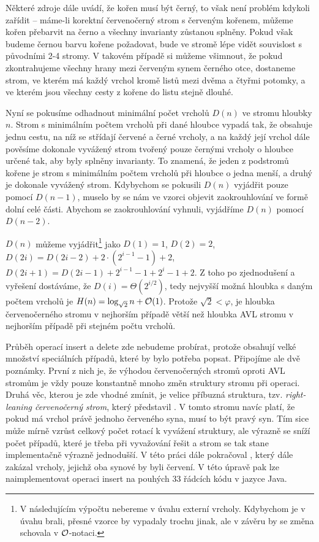 Některé zdroje dále uvádí, že kořen musí být černý, to však není problém kdykoli zařídit -- máme-li korektní červenočerný strom s červeným kořenem, můžeme kořen přebarvit na černo a všechny invarianty zůstanou splněny. Pokud však budeme černou barvu kořene požadovat, bude ve stromě lépe vidět souvislost s původními 2-4 stromy. V takovém případě si můžeme všimnout, že pokud zkontrahujeme všechny hrany mezi červeným synem černého otce, dostaneme strom, ve kterém má každý vrchol kromě listů mezi dvěma a čtyřmi potomky, a ve kterém jsou všechny cesty z kořene do listu stejně dlouhé.

Nyní se pokusíme odhadnout minimální počet vrcholů $D(n)$ ve stromu hloubky $n$. Strom s minimálním počtem vrcholů při dané hloubce vypadá tak, že obsahuje jednu cestu, na níž se střídají červené a černé vrcholy, a na každý její vrchol dále pověsíme dokonale vyvážený strom tvořený pouze černými vrcholy o hloubce určené tak, aby byly splněny invarianty. To znamená, že jeden z podstromů kořene je strom s minimálním počtem vrcholů při hloubce o jedna menší, a druhý je dokonale vyvážený strom. Kdybychom se pokusili $D(n)$ vyjádřit pouze pomocí $D(n-1)$, muselo by se nám ve vzorci objevit zaokrouhlování ve formě dolní celé části. Abychom se zaokrouhlování vyhnuli, vyjádříme $D(n)$ pomocí $D(n-2)$.

$D(n)$ můžeme vyjádřit\footnote{V následujícím výpočtu nebereme v úvahu externí vrcholy. Kdybychom je v úvahu brali, přesné vzorce by vypadaly trochu jinak, ale v závěru by se změna schovala v $\mathcal O$-notaci.} jako $D(1)=1$, $D(2) = 2$, $D(2i) = D(2i-2) + 2 \cdot
(2^{i - 1} - 1) + 2$, $D(2i + 1) = D(2i - 1) + 2^{i-1}-1 + 2^i-1 + 2$. Z toho
po zjednodušení a vyřešení dostáváme, že $D(i)=\Theta(2^{i/2})$, tedy nejvyšší
možná hloubka s daným počtem vrcholů je $H(n) = \log_{\sqrt 2} n + \mathcal O(1)$.
Protože  $\sqrt 2 < \varphi$, je hloubka červenočerného stromu v nejhorším
případě větší než hloubka AVL stromu v nejhorším případě při stejném počtu
vrcholů.

Průběh operací insert a delete zde nebudeme probírat, protože obsahují velké
množství speciálních případů, které by bylo potřeba popsat. Připojíme ale
dvě poznámky. První z nich je, že výhodou červenočerných stromů oproti AVL
stromům je vždy pouze konstantně mnoho změn struktury stromu při operaci. Druhá
věc, kterou je zde vhodné zmínit, je velice příbuzná struktura, tzv.
\emph{right-leaning červenočerný strom}, který představil \citet{rightleaning}.
V tomto stromu navíc platí, že pokud má vrchol právě jednoho červeného syna,
musí to být pravý syn. Tím sice může mírně vzrůst celkový počet rotací k
vyvážení struktury, ale výrazně se sníží počet případů, které je třeba při
vyvažování řešit a strom se tak stane implementačně výrazně jednodušší. V této
práci dále pokračoval \citet{leftleaning}, který dále zakázal vrcholy, jejichž
oba synové by byli červení. V této úpravě pak lze naimplementovat operaci
insert na pouhých 33 řádcích kódu v jazyce Java.    

